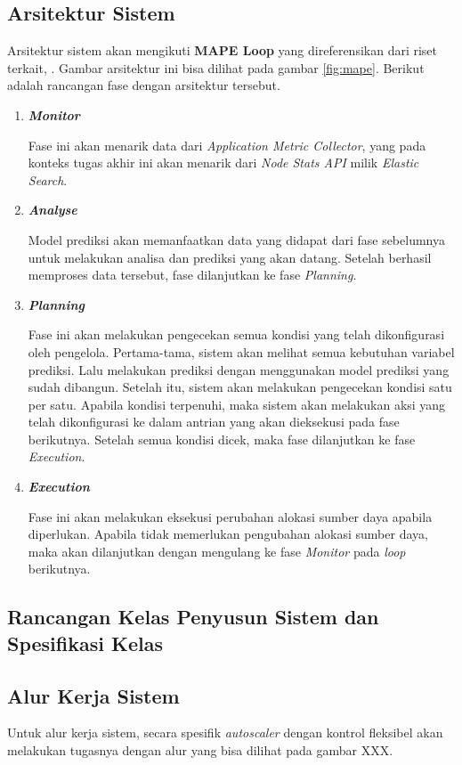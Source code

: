\subsection{Arsitektur Sistem}

Arsitektur sistem akan mengikuti \textbf{MAPE Loop} yang direferensikan dari riset terkait, \parencite{riset1}. Gambar arsitektur ini bisa dilihat pada gambar \ref{fig:mape}. Berikut adalah rancangan fase dengan arsitektur tersebut.

\begin{enumerate}
    \item \bfseries \textit{Monitor} \normalfont
    
        Fase ini akan menarik data dari \textit{Application Metric Collector}, yang pada konteks tugas akhir ini akan menarik dari \textit{Node Stats API} milik \textit{Elastic Search}.
    \item \bfseries \textit{Analyse} \normalfont
    
        Model prediksi akan memanfaatkan data yang didapat dari fase sebelumnya untuk melakukan analisa dan prediksi yang akan datang. Setelah berhasil memproses data tersebut, fase dilanjutkan ke fase \textit{Planning}.
    \item \bfseries \textit{Planning} \normalfont
    
        Fase ini akan melakukan pengecekan semua kondisi yang telah dikonfigurasi oleh pengelola. Pertama-tama, sistem akan melihat semua kebutuhan variabel prediksi. Lalu melakukan prediksi dengan menggunakan model prediksi yang sudah dibangun. Setelah itu, sistem akan melakukan pengecekan kondisi satu per satu. Apabila kondisi terpenuhi, maka sistem akan melakukan aksi yang telah dikonfigurasi ke dalam antrian yang akan dieksekusi pada fase berikutnya. Setelah semua kondisi dicek, maka fase dilanjutkan ke fase \textit{Execution}.
    \item \bfseries \textit{Execution} \normalfont
    
        Fase ini akan melakukan eksekusi perubahan alokasi sumber daya apabila diperlukan. Apabila tidak memerlukan pengubahan alokasi sumber daya, maka akan dilanjutkan dengan mengulang ke fase \textit{Monitor} pada \textit{loop} berikutnya.
\end{enumerate}

\subsection{Rancangan Kelas Penyusun Sistem dan Spesifikasi Kelas}

\subsection{Alur Kerja Sistem}

Untuk alur kerja sistem, secara spesifik \textit{autoscaler} dengan kontrol fleksibel akan melakukan tugasnya dengan alur yang bisa dilihat pada gambar XXX.